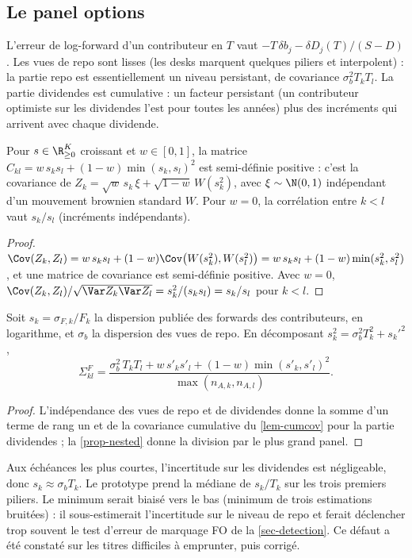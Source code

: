 \subsection{Le panel options}
L'erreur de log-forward d'un contributeur en $T$ vaut $-T\,\delta b_j-\delta D_j(T)/(S-D)$. Les vues de repo sont lisses
(les desks marquent quelques piliers et interpolent) : la partie repo est essentiellement un niveau persistant, de
covariance $\sigma_b^2T_kT_l$. La partie dividendes est cumulative : un facteur persistant (un contributeur optimiste sur
les dividendes l'est pour toutes les années) plus des incréments qui arrivent avec chaque dividende.

\begin{lemma}\label{lem-cumcov}
Pour $s\in\R^K_{\ge0}$ croissant et $w\in[0,1]$, la matrice $C_{kl}=w\,s_ks_l+(1-w)\min(s_k,s_l)^2$ est semi-définie
positive : c'est la covariance de $Z_k=\sqrt{w}\,s_k\,\xi+\sqrt{1-w}\,W(s_k^2)$, avec $\xi\sim\N(0,1)$ indépendant d'un
mouvement brownien standard $W$. Pour $w=0$, la corrélation entre $k<l$ vaut $s_k/s_l$ (incréments indépendants).
\end{lemma}
\begin{proof}
$\Cov(Z_k,Z_l)=w\,s_ks_l+(1-w)\Cov\bigl(W(s_k^2),W(s_l^2)\bigr)=w\,s_ks_l+(1-w)\min(s_k^2,s_l^2)$, et une matrice de
covariance est semi-définie positive. Avec $w=0$, $\Cov(Z_k,Z_l)/\sqrt{\Var Z_k\Var Z_l}=s_k^2/(s_ks_l)=s_k/s_l$ pour $k<l$.
\end{proof}

\begin{proposition}\label{prop-sigmaF}
Soit $s_k=\sigma_{F,k}/F_k$ la dispersion publiée des forwards des contributeurs, en logarithme, et $\sigma_b$ la
dispersion des vues de repo. En décomposant $s_k^2=\sigma_b^2T_k^2+s_k'^2$,
\begin{equation}\label{eq-sigmaF}
\Sigma^F_{kl}=\frac{\sigma_b^2\,T_kT_l+w\,s'_ks'_l+(1-w)\min(s'_k,s'_l)^2}{\max(n_{A,k},n_{A,l})}.
\end{equation}
\end{proposition}
\begin{proof}
L'indépendance des vues de repo et de dividendes donne la somme d'un terme de rang un et de la covariance cumulative du
\cref{lem-cumcov} pour la partie dividendes ; la \cref{prop-nested} donne la division par le plus grand panel.
\end{proof}

\begin{remark}
Aux échéances les plus courtes, l'incertitude sur les dividendes est négligeable, donc $s_k\approx\sigma_bT_k$. Le
prototype prend la médiane de $s_k/T_k$ sur les trois premiers piliers. Le minimum serait biaisé vers le bas (minimum de
trois estimations bruitées) : il sous-estimerait l'incertitude sur le niveau de repo et ferait déclencher trop souvent le
test d'erreur de marquage FO de la \cref{sec-detection}. Ce défaut a été constaté sur les titres difficiles à emprunter,
puis corrigé.
\end{remark}

